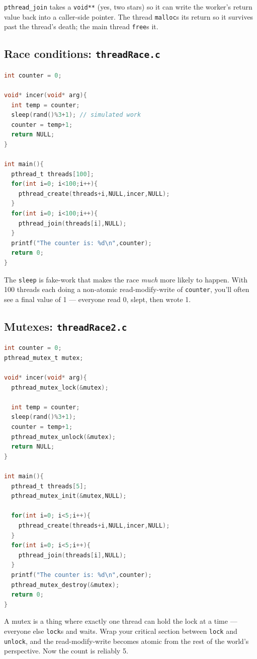 \documentclass[11pt]{article}
\begin{document}
\texttt{pthread\_join} takes a \texttt{void**} (yes, two stars) so
it can write the worker's return value back into a caller-side
pointer. The thread \texttt{malloc}s its return so it survives past
the thread's death; the main thread \texttt{free}s it.

\subsection*{Race conditions: \texttt{threadRace.c}}

\begin{lstlisting}[language=C]
int counter = 0;

void* incer(void* arg){
  int temp = counter;
  sleep(rand()%3+1); // simulated work
  counter = temp+1;
  return NULL;
}

int main(){
  pthread_t threads[100];
  for(int i=0; i<100;i++){
    pthread_create(threads+i,NULL,incer,NULL);
  }
  for(int i=0; i<100;i++){
    pthread_join(threads[i],NULL);
  }
  printf("The counter is: %d\n",counter);
  return 0;
}
\end{lstlisting}

The \texttt{sleep} is fake-work that makes the race \emph{much}
more likely to happen. With 100 threads each doing a non-atomic
read-modify-write of \texttt{counter}, you'll often see a final
value of 1 --- everyone read 0, slept, then wrote 1.

\subsection*{Mutexes: \texttt{threadRace2.c}}

\begin{lstlisting}[language=C]
int counter = 0;
pthread_mutex_t mutex;

void* incer(void* arg){
  pthread_mutex_lock(&mutex);

  int temp = counter;
  sleep(rand()%3+1);
  counter = temp+1;
  pthread_mutex_unlock(&mutex);
  return NULL;
}

int main(){
  pthread_t threads[5];
  pthread_mutex_init(&mutex,NULL);

  for(int i=0; i<5;i++){
    pthread_create(threads+i,NULL,incer,NULL);
  }
  for(int i=0; i<5;i++){
    pthread_join(threads[i],NULL);
  }
  printf("The counter is: %d\n",counter);
  pthread_mutex_destroy(&mutex);
  return 0;
}
\end{lstlisting}

A mutex is a thing where exactly one thread can hold the lock at a
time --- everyone else \texttt{lock}s and waits. Wrap your critical
section between \texttt{lock} and \texttt{unlock}, and the
read-modify-write becomes atomic from the rest of the world's
perspective. Now the count is reliably 5.
\end{document}
